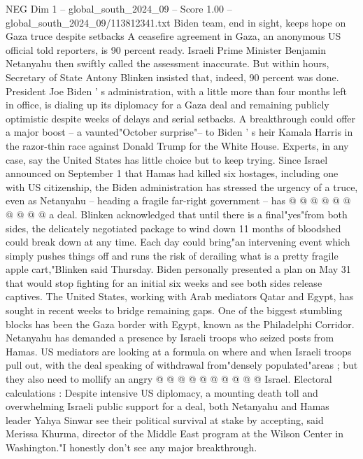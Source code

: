 \begin{textsample}{NEG Dim 1 – global\_south\_2024\_09 – Score 1.00 – global\_south\_2024\_09/113812341.txt}  \label{ex:f1_neg_417}
Biden team, end in sight, keeps hope on Gaza truce despite setbacks A ceasefire agreement in Gaza, an anonymous US official told reporters, is 90 percent ready.
Israeli Prime Minister Benjamin Netanyahu then swiftly called the assessment inaccurate.
But within hours, Secretary of State Antony Blinken insisted that, indeed, 90 percent was done.
President Joe Biden ' s administration, with a little more than four months left in office, is dialing up its diplomacy for a Gaza deal and remaining publicly optimistic despite weeks of delays and serial setbacks.
A breakthrough could offer a major boost -- a vaunted"October surprise"-- to Biden ' s heir Kamala Harris in the razor-thin race against Donald Trump for the White House.
Experts, in any case, say the United States has little choice but to keep trying.
Since Israel announced on September 1 that Hamas had killed six hostages, including one with US citizenship, the Biden administration has stressed the urgency of a truce, even as Netanyahu -- heading a fragile far-right government -- has @ @ @ @ @ @ @ @ @ @ a deal.
Blinken acknowledged that until there is a final"yes"from both sides, the delicately negotiated package to wind down 11 months of bloodshed could break down at any time.
Each day could bring"an intervening event which simply pushes things off and runs the risk of derailing what is a pretty fragile apple cart,"Blinken said Thursday.
Biden personally presented a plan on May 31 that would stop fighting for an initial six weeks and see both sides release captives.
The United States, working with Arab mediators Qatar and Egypt, has sought in recent weeks to bridge remaining gaps.
One of the biggest stumbling blocks has been the Gaza border with Egypt, known as the Philadelphi Corridor.
Netanyahu has demanded a presence by Israeli troops who seized posts from Hamas.
US mediators are looking at a formula on where and when Israeli troops pull out, with the deal speaking of withdrawal from"densely populated"areas ; but they also need to mollify an angry @ @ @ @ @ @ @ @ @ @ Israel.
Electoral calculations : Despite intensive US diplomacy, a mounting death toll and overwhelming Israeli public support for a deal, both Netanyahu and Hamas leader Yahya Sinwar see their political survival at stake by accepting, said Merissa Khurma, director of the Middle East program at the Wilson Center in Washington."I honestly don't see any major breakthrough.

\end{textsample}
